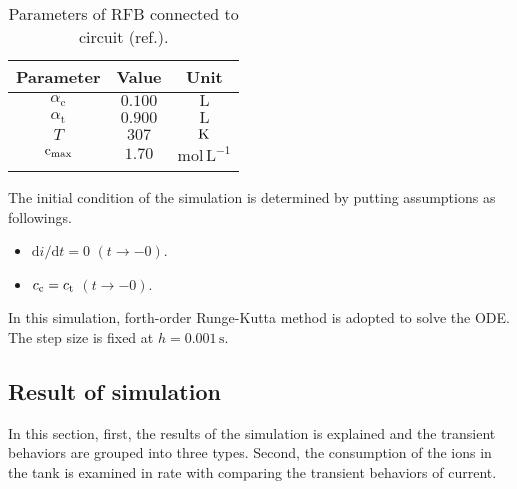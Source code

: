 \documentclass[a4paper]{article}
\newcommand{\Cc}{c_{\rm c}}
\newcommand{\Ct}{c_{\rm t}}
\newcommand{\Cmax}{{\rm c_{max}}}
\newcommand{\ac}{\alpha_\mathrm{c}}
\newcommand{\at}{\alpha_\mathrm{t}}
\newcommand{\dd}[2]{\mathrm{d}#1/\mathrm{d}#2}
\begin{document}
\begin{table}[h]
 \begin{center}
  \caption{Parameters of RFB connected to circuit (ref.\cite{model-minghua-dynamical-simulation}).}
  \begin{tabular}{ccc}\hline
   Parameter&Value&Unit\\\hline
   $\ac$&$0.100$&$\mathrm{L}$\\
   $\at$&$0.900$&$\mathrm{L}$\\
   $T $&$307$&${\rm K}$\\
   $\Cmax$&$1.70$&$\mathrm{mol\,L^{-1}}$\\\hline
   \label{tab:parameter}
  \end{tabular}
 \end{center}
\end{table}
The initial condition of the simulation is determined by putting assumptions as followings. 
\begin{itemize}
 \item $\dd{i}{t}=0$ $(t\rightarrow-0)$. 
 \item $\Cc=\Ct$ $(t\rightarrow-0)$. 
\end{itemize}
In this simulation, forth-order Runge-Kutta method \cite{Numerical-Recipes-in-C} is adopted to solve the ODE. 
The step size is fixed at $h=0.001\,\mathrm{s}$. 

\subsection{Result of simulation}
In this section, first, the results of the simulation is explained and 
the transient behaviors are grouped into three types. 
Second, the consumption of the ions in the tank is examined in rate with comparing the transient behaviors of current. 
\end{document}
